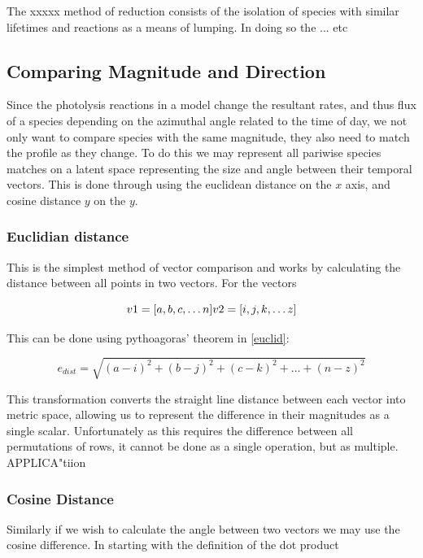 The xxxxx method of reduction consists of the isolation of species with similar lifetimes and reactions as a means of lumping. In doing so the ... etc 


\subsection{Comparing Magnitude and Direction}
Since the photolysis reactions in a model change the resultant rates, and thus flux of a species depending on the azimuthal angle related to the time of day, we not only want to compare species with the same magnitude, they also need to match the profile as they change. To do this we may represent all pariwise species matches on a latent space representing the size and angle between their temporal vectors. This is done through using the euclidean distance on the $x$ axis, and cosine distance $y$ on the $y$. 

\subsubsection{Euclidian distance}
This is the simplest method of vector comparison and works by calculating the distance between all points in two vectors. For the vectors

\begin{equation}
v1 = [ a,b,c, \dots n ] 
$$$$
v2 = [ i,j,k, \dots z ]
\end{equation}

This can be done using pythoagoras' theorem in \autoref{euclid}:

\begin{equation}
e_{dist}  = \sqrt{(a-i)^2 + (b-j)^2 + (c-k)^2 + \dots + (n-z)^2}
\label{euclid}
\end{equation}

This transformation converts the straight line distance between each vector into metric space, allowing us to represent the difference in their magnitudes as a single scalar. Unfortunately as this requires the difference between all permutations of rows, it cannot be done as a single operation, but as multiple. \\

APPLICA"tiion

\subsubsection{Cosine Distance} 

Similarly if we wish to calculate the angle between two vectors we may use the cosine difference. In starting with the definition of the dot product 

